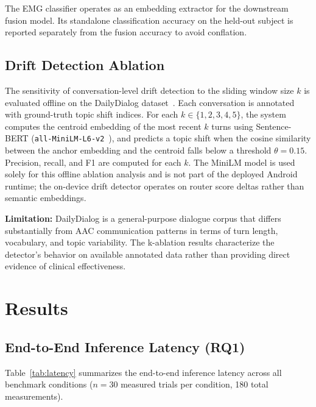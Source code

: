 \documentclass[journal]{IEEEtran}
\begin{document}
The EMG classifier operates as an embedding extractor for the downstream fusion model. Its standalone classification accuracy on the held-out subject is reported separately from the fusion accuracy to avoid conflation.

\subsection{Drift Detection Ablation}
\label{sec:drift_eval}

The sensitivity of conversation-level drift detection to the sliding window size $k$ is evaluated offline on the DailyDialog dataset~\cite{dailydialog}. Each conversation is annotated with ground-truth topic shift indices. For each $k \in \{1, 2, 3, 4, 5\}$, the system computes the centroid embedding of the most recent $k$ turns using Sentence-BERT (\texttt{all-MiniLM-L6-v2}~\cite{minilm}), and predicts a topic shift when the cosine similarity between the anchor embedding and the centroid falls below a threshold $\theta = 0.15$. Precision, recall, and F1 are computed for each $k$. The MiniLM model is used solely for this offline ablation analysis and is not part of the deployed Android runtime; the on-device drift detector operates on router score deltas rather than semantic embeddings.

\textbf{Limitation:} DailyDialog is a general-purpose dialogue corpus that differs substantially from AAC communication patterns in terms of turn length, vocabulary, and topic variability. The k-ablation results characterize the detector's behavior on available annotated data rather than providing direct evidence of clinical effectiveness.

\section{Results}
\label{sec:results}

\subsection{End-to-End Inference Latency (RQ1)}
\label{sec:results_latency}

Table~\ref{tab:latency} summarizes the end-to-end inference latency across all benchmark conditions ($n = 30$ measured trials per condition, 180 total measurements).
\end{document}
